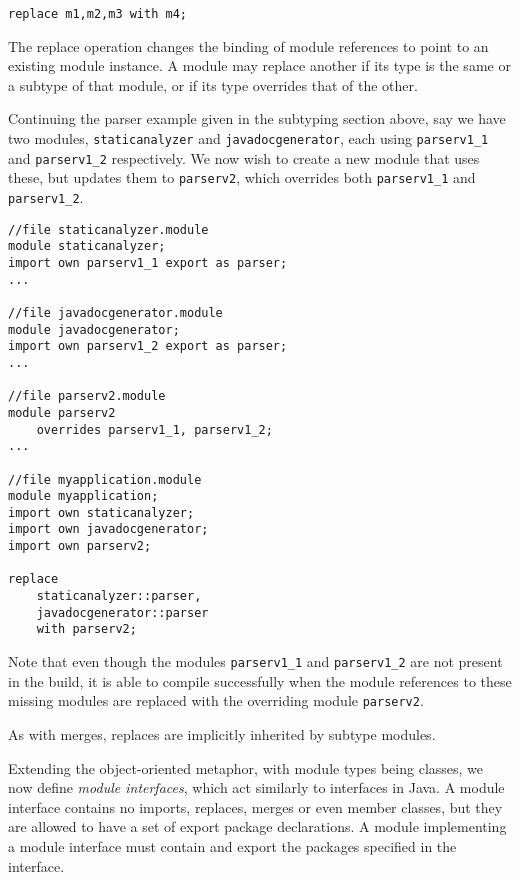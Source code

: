 \begin{lstlisting}
replace m1,m2,m3 with m4;
\end{lstlisting}

The replace operation
changes the binding of module references to point to an existing
module instance. A module may replace another if its type is the same or a subtype
of that module, or if its type overrides that of the other.

Continuing the parser example given in the subtyping section above, say we have two 
modules, {\tt staticanalyzer} and {\tt javadocgenerator}, each using {\tt parserv1\_1}
and {\tt parserv1\_2} respectively. We now wish to create a new module that uses these, 
but updates them to {\tt parserv2}, which overrides both {\tt parserv1\_1} and {\tt parserv1\_2}.

\begin{lstlisting}[caption=Module Replace]
//file staticanalyzer.module
module staticanalyzer;
import own parserv1_1 export as parser;
...

//file javadocgenerator.module
module javadocgenerator;
import own parserv1_2 export as parser;
...

//file parserv2.module
module parserv2 
	overrides parserv1_1, parserv1_2;
...

//file myapplication.module
module myapplication;
import own staticanalyzer;
import own javadocgenerator;
import own parserv2;

replace 
	staticanalyzer::parser,
	javadocgenerator::parser
	with parserv2;
\end{lstlisting}

Note that even though the modules {\tt parserv1\_1} and {\tt parserv1\_2}
are not present in the build, it is able to compile successfully when the
module references to these missing modules are replaced with the overriding
module {\tt parserv2}.

As with merges, replaces are implicitly inherited by subtype modules.



Extending the object-oriented metaphor, with module types being classes, we 
now define \textit{module interfaces}, which act similarly to interfaces in Java. A module
interface contains no imports, replaces, merges or even member classes, but they
are allowed to have a set of export package declarations. A module implementing
a module interface must contain and export the packages specified in the interface.

